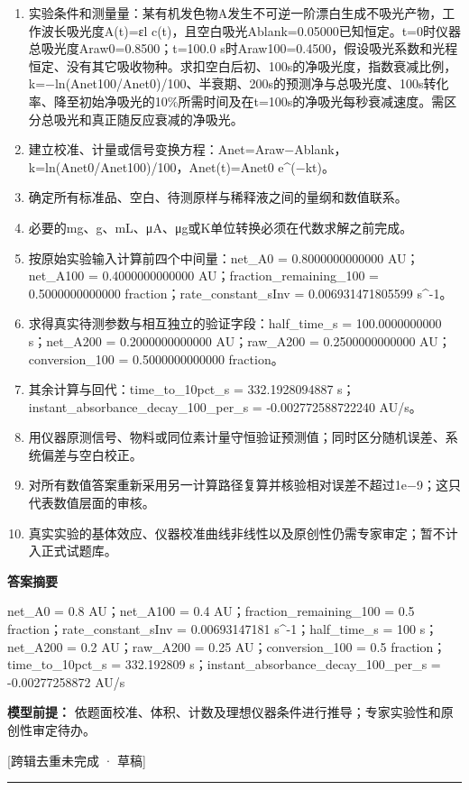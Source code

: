 \documentclass[UTF8,11pt,a4paper]{ctexart}
\begin{document}
\begin{enumerate}
\item 实验条件和测量量：某有机发色物A发生不可逆一阶漂白生成不吸光产物，工作波长吸光度A(t)=εl c(t)，且空白吸光Ablank=0.05000已知恒定。t=0时仪器总吸光度Araw0=0.8500；t=100.0 s时Araw100=0.4500，假设吸光系数和光程恒定、没有其它吸收物种。求扣空白后初、100s的净吸光度，指数衰减比例，k=−ln(Anet100/Anet0)/100、半衰期、200s的预测净与总吸光度、100s转化率、降至初始净吸光的10\%所需时间及在t=100s的净吸光每秒衰减速度。需区分总吸光和真正随反应衰减的净吸光。
\item 建立校准、计量或信号变换方程：Anet=Araw−Ablank，k=ln(Anet0/Anet100)/100，Anet(t)=Anet0 e\textasciicircum{}(−kt)。
\item 确定所有标准品、空白、待测原样与稀释液之间的量纲和数值联系。
\item 必要的mg、g、mL、μA、μg或K单位转换必须在代数求解之前完成。
\item 按原始实验输入计算前四个中间量：net\_A0 = 0.8000000000000 AU；net\_A100 = 0.4000000000000 AU；fraction\_remaining\_100 = 0.5000000000000 fraction；rate\_constant\_sInv = 0.006931471805599 s\textasciicircum{}-1。
\item 求得真实待测参数与相互独立的验证字段：half\_time\_s = 100.0000000000 s；net\_A200 = 0.2000000000000 AU；raw\_A200 = 0.2500000000000 AU；conversion\_100 = 0.5000000000000 fraction。
\item 其余计算与回代：time\_to\_10pct\_s = 332.1928094887 s；instant\_absorbance\_decay\_100\_per\_s = -0.002772588722240 AU/s。
\item 用仪器原测信号、物料或同位素计量守恒验证预测值；同时区分随机误差、系统偏差与空白校正。
\item 对所有数值答案重新采用另一计算路径复算并核验相对误差不超过1e−9；这只代表数值层面的审核。
\item 真实实验的基体效应、仪器校准曲线非线性以及原创性仍需专家审定；暂不计入正式试题库。
\end{enumerate}
\noindent\textbf{答案摘要}\par
net\_A0 = 0.8 AU；net\_A100 = 0.4 AU；fraction\_remaining\_100 = 0.5 fraction；rate\_constant\_sInv = 0.00693147181 s\textasciicircum{}-1；half\_time\_s = 100 s；net\_A200 = 0.2 AU；raw\_A200 = 0.25 AU；conversion\_100 = 0.5 fraction；time\_to\_10pct\_s = 332.192809 s；instant\_absorbance\_decay\_100\_per\_s = -0.00277258872 AU/s\par
\noindent\textbf{模型前提：}
依题面校准、体积、计数及理想仪器条件进行推导；专家实验性和原创性审定待办。\par
\noindent\textcolor{red!65!black}{[跨辑去重未完成 · 草稿]} \par
\medskip\hrule\medskip
{}
\end{document}
